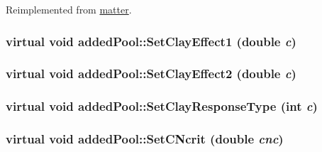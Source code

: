 Reimplemented from \hyperlink{classmatter_a9fe8f4ee934f280c9964dacc27d42611}{matter}.\hypertarget{classadded_pool_a1ef97d19e864d5424801ef2cbab85bc2}{
\subsubsection[{SetClayEffect1}]{\setlength{\rightskip}{0pt plus 5cm}virtual void addedPool::SetClayEffect1 (double {\em c})}}
\label{classadded_pool_a1ef97d19e864d5424801ef2cbab85bc2}
\hypertarget{classadded_pool_ae72c1de15194151dcc6fbc2b29e6c7d3}{
\subsubsection[{SetClayEffect2}]{\setlength{\rightskip}{0pt plus 5cm}virtual void addedPool::SetClayEffect2 (double {\em c})}}
\label{classadded_pool_ae72c1de15194151dcc6fbc2b29e6c7d3}
\hypertarget{classadded_pool_a467e82b7fa7d7be8a8b72b3f0971a0c1}{
\subsubsection[{SetClayResponseType}]{\setlength{\rightskip}{0pt plus 5cm}virtual void addedPool::SetClayResponseType (int {\em c})}}
\label{classadded_pool_a467e82b7fa7d7be8a8b72b3f0971a0c1}
\hypertarget{classadded_pool_ae44b05bd5c582fc559ea3713ce6ae828}{
\subsubsection[{SetCNcrit}]{\setlength{\rightskip}{0pt plus 5cm}virtual void addedPool::SetCNcrit (double {\em cnc})}}
\label{classadded_pool_ae44b05bd5c582fc559ea3713ce6ae828}
